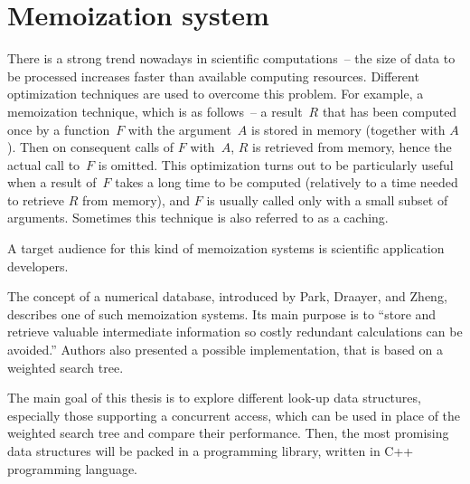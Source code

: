 
\section{Memoization system}
There is a strong trend nowadays in scientific computations~-- the size of data to be processed increases faster than available computing resources. Different optimization techniques are used to overcome this problem. For example, a memoization technique, which is as follows~-- a result~$R$ that has been computed once by a function~$F$ with the argument~$A$ is stored in memory (together with $A$). Then on consequent calls of $F$ with~$A$, $R$ is retrieved from memory, hence the actual call to~$F$ is omitted. This optimization turns out to be particularly useful when a result of~$F$ takes a long time to be computed (relatively to a time needed to retrieve $R$ from memory), and $F$ is usually called only with a small subset of arguments. Sometimes this technique is also referred to as a caching.

A target audience for this kind of memoization systems is scientific application developers.

The concept of a numerical database, introduced by Park, Draayer, and Zheng\cite{park90}, describes one of such memoization systems. Its main purpose is to ``store and retrieve valuable intermediate information so costly redundant calculations can be avoided.'' Authors also presented a possible implementation, that is based on a weighted search tree.

The main goal of this thesis is to explore different look-up data structures, especially those supporting a concurrent access, which can be used in place of the weighted search tree and compare their performance. Then, the most promising data structures will be packed in a programming library, written in C++ programming language.


